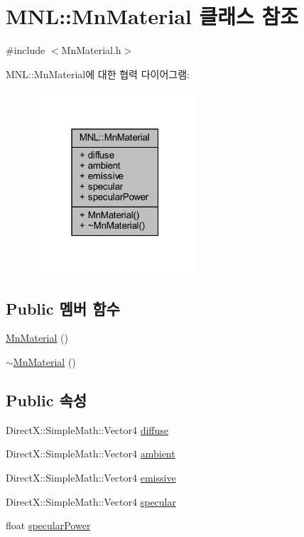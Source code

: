 \hypertarget{class_m_n_l_1_1_mn_material}{}\section{M\+NL\+:\+:Mn\+Material 클래스 참조}
\label{class_m_n_l_1_1_mn_material}


{\ttfamily \#include $<$Mn\+Material.\+h$>$}



M\+NL\+:\+:Mn\+Material에 대한 협력 다이어그램\+:\nopagebreak
\begin{figure}[H]
\begin{center}
\leavevmode
\includegraphics[width=171pt]{class_m_n_l_1_1_mn_material__coll__graph}
\end{center}
\end{figure}
\subsection*{Public 멤버 함수}
\begin{DoxyCompactItemize}
\item 
\hyperlink{class_m_n_l_1_1_mn_material_aad9a010b9ae350c5c1f33f81bdc2bebb}{Mn\+Material} ()
\item 
\hyperlink{class_m_n_l_1_1_mn_material_a5eb1c2ba8f8deac5d1cce68e00b7c4f6}{$\sim$\+Mn\+Material} ()
\end{DoxyCompactItemize}
\subsection*{Public 속성}
\begin{DoxyCompactItemize}
\item 
Direct\+X\+::\+Simple\+Math\+::\+Vector4 \hyperlink{class_m_n_l_1_1_mn_material_a0286b31f8f107f8c538f0db9a18acaa2}{diffuse}
\item 
Direct\+X\+::\+Simple\+Math\+::\+Vector4 \hyperlink{class_m_n_l_1_1_mn_material_aa6897e5662f3dbac8f72e96ef722ac0d}{ambient}
\item 
Direct\+X\+::\+Simple\+Math\+::\+Vector4 \hyperlink{class_m_n_l_1_1_mn_material_a58bf008b04d0245f6470da8ca3d4d735}{emissive}
\item 
Direct\+X\+::\+Simple\+Math\+::\+Vector4 \hyperlink{class_m_n_l_1_1_mn_material_a7f083df1bc6578e41917bd4a237448bf}{specular}
\item 
float \hyperlink{class_m_n_l_1_1_mn_material_abfcc4a9b518663738879256b440e432a}{specular\+Power}
\end{DoxyCompactItemize}


